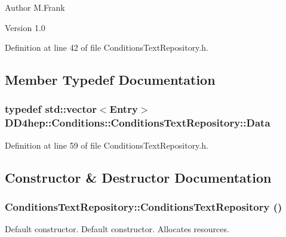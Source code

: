 \begin{DoxyAuthor}{Author}
M.Frank 
\end{DoxyAuthor}
\begin{DoxyVersion}{Version}
1.0 
\end{DoxyVersion}


Definition at line 42 of file ConditionsTextRepository.h.

\subsection{Member Typedef Documentation}
\hypertarget{class_d_d4hep_1_1_conditions_1_1_conditions_text_repository_afe5d8989bf0bcd711e59f838943b5115}{
\subsubsection[{Data}]{\setlength{\rightskip}{0pt plus 5cm}typedef std::vector$<${\bf Entry}$>$ {\bf DD4hep::Conditions::ConditionsTextRepository::Data}}}
\label{class_d_d4hep_1_1_conditions_1_1_conditions_text_repository_afe5d8989bf0bcd711e59f838943b5115}


Definition at line 59 of file ConditionsTextRepository.h.

\subsection{Constructor \& Destructor Documentation}
\hypertarget{class_d_d4hep_1_1_conditions_1_1_conditions_text_repository_ae00798ba3a2736978fc0b9c3a9325abe}{
\subsubsection[{ConditionsTextRepository}]{\setlength{\rightskip}{0pt plus 5cm}ConditionsTextRepository::ConditionsTextRepository ()}}
\label{class_d_d4hep_1_1_conditions_1_1_conditions_text_repository_ae00798ba3a2736978fc0b9c3a9325abe}


Default constructor. Default constructor. Allocates resources. 

